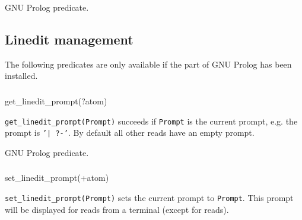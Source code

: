 \Portability

GNU Prolog predicate.

\subsection{Linedit management}
The following predicates are only available if the  part of
GNU Prolog has been installed.

\subsubsection{}

\begin{TemplatesOneCol}
get\_linedit\_prompt(?atom)

\end{TemplatesOneCol}

\Description

\texttt{get\_linedit\_prompt(Prompt)} succeeds if \texttt{Prompt} is the
current  prompt, e.g. the  prompt is
\texttt{'| ?-'}. By default all other reads have an empty prompt.

\begin{PlErrors}


\end{PlErrors}

\Portability

GNU Prolog predicate.

\subsubsection{}

\begin{TemplatesOneCol}
set\_linedit\_prompt(+atom)

\end{TemplatesOneCol}

\Description

\texttt{set\_linedit\_prompt(Prompt)} sets the current 
prompt to \texttt{Prompt}. This prompt will be displayed for reads from a
terminal (except for  reads).

\begin{PlErrors}



\end{PlErrors}


